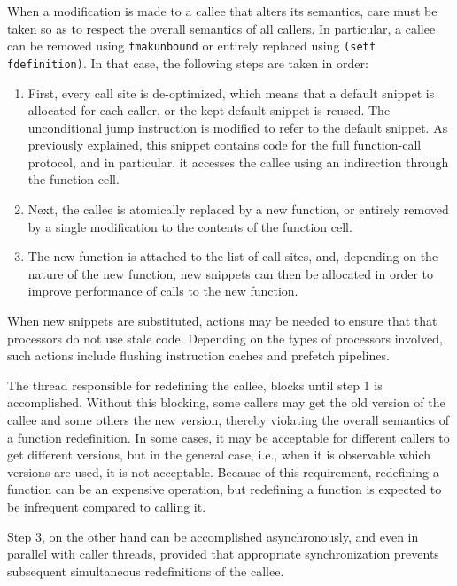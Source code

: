 When a modification is made to a callee that alters its semantics,
care must be taken so as to respect the overall semantics of all
callers.  In particular, a callee can be removed using
\texttt{fmakunbound} or entirely replaced using \texttt{(setf
  fdefinition)}.  In that case, the following steps are taken in
order:

\begin{enumerate}
\item First, every call site is de-optimized, which means that a
  default snippet is allocated for each caller, or the kept default
  snippet is reused.  The unconditional jump instruction is modified
  to refer to the default snippet.  As previously explained, this
  snippet contains code for the full function-call protocol, and in
  particular, it accesses the callee using an indirection through the
  function cell.
\item Next, the callee is atomically replaced by a new function, or
  entirely removed by a single modification to the contents of the
  function cell.
\item The new function is attached to the list of call sites, and,
  depending on the nature of the new function, new snippets can then
  be allocated in order to improve performance of calls to the new
  function.
\end{enumerate}

\noindent
When new snippets are substituted, actions may be needed to ensure
that that processors do not use stale code.  Depending on the types of
processors involved, such actions include flushing instruction caches
and prefetch pipelines.

The thread responsible for redefining the callee, blocks until step 1
is accomplished.  Without this blocking, some callers may get the old
version of the callee and some others the new version, thereby
violating the overall semantics of a function redefinition.  In some
cases, it may be acceptable for different callers to get different
versions, but in the general case, i.e., when it is observable which
versions are used, it is not acceptable.  Because of this requirement,
redefining a function can be an expensive operation, but redefining a
function is expected to be infrequent compared to calling it.

Step 3, on the other hand can be accomplished asynchronously, and even
in parallel with caller threads, provided that appropriate
synchronization prevents subsequent simultaneous redefinitions of the
callee.

